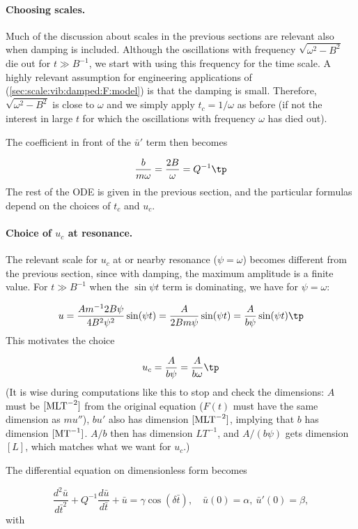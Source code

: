 \documentclass[graybox,envcountchap,sectrefs,final]{svmonodo}
\begin{document}
\paragraph{Choosing scales.}
Much of the discussion about scales in the previous sections are
relevant also when damping is included.  Although the oscillations
with frequency $\sqrt{\omega^2-B^2}$ die out for $t\gg B^{-1}$, we
start with using this frequency for the time scale.  A highly relevant
assumption for engineering applications of
(\ref{sec:scale:vib:damped:F:model}) is that the damping is small.
Therefore, $\sqrt{\omega^2-B^2}$ is close to $\omega$ and we simply
apply $t_c=1/\omega$ as before (if not the interest in large $t$ for
which the oscillations with frequency $\omega$ has died out).

The coefficient in front of the $\bar u'$ term then becomes

\[ \frac{b}{m\omega} = \frac{2B}{\omega} = Q^{-1}\tp\]
The rest of the ODE is given in the previous section, and the particular
formulas depend on the choices of $t_c$ and $u_c$.

\paragraph{Choice of $u_c$ at resonance.}
The relevant scale for $u_c$ at or nearby resonance ($\psi = \omega$)
becomes different from the previous section, since with damping,
the maximum amplitude is a finite value. For $t\gg B^{-1}$ when the
$\sin\psi t$ term is dominating, we have for $\psi = \omega$:

\[ u = \frac{Am^{-1}2B\psi}{4B^2\psi^2}\sin (\psi t) =
\frac{A}{2Bm\psi}\sin (\psi t) =
\frac{A}{b\psi}\sin (\psi t)
\tp
\]
This motivates the choice

\[ u_c = \frac{A}{b\psi} = \frac{A}{b\omega}\tp\]
(It is wise during computations like this to stop and check the
dimensions: $A$ must be $[\hbox{MLT}^{-2}]$ from the original
equation ($F(t)$ must have the same dimension as $mu''$),
$bu'$ also has dimension $[\hbox{MLT}^{-2}]$, implying that
$b$ has dimension $[\hbox{MT}^{-1}]$. $A/b$ then has dimension
$LT^{-1}$, and $A/(b\psi)$ gets dimension $[L]$, which matches
what we want for $u_c$.)

The differential equation on dimensionless form becomes

\begin{equation}
\frac{d^2\bar u}{d\bar t^2} + Q^{-1}\frac{d\bar u}{d\bar t} + \bar u =
\gamma
\cos(\delta\bar t),
\quad \bar u(0)=\alpha,\ \bar u'(0)=\beta,
\label{sec:scale:vib:damped:F:model:scaled1}
\end{equation}
with
\end{document}
